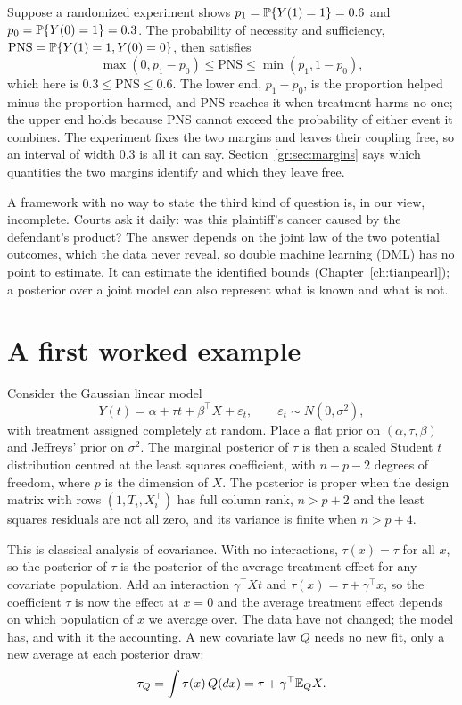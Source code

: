 Suppose a randomized experiment shows $p_1 = \mathbb{P}\{Y(1) = 1\} = 0.6$ and $p_0 = \mathbb{P}\{Y(0) = 1\} = 0.3$. The probability of necessity and sufficiency, $\mathrm{PNS} = \mathbb{P}\{Y(1) = 1, Y(0) = 0\}$, then satisfies
\[
\max(0, p_1 - p_0) \le \mathrm{PNS} \le \min(p_1, 1 - p_0),
\]
which here is $0.3 \le \mathrm{PNS} \le 0.6$. The lower end, $p_1 - p_0$, is the proportion helped minus the proportion harmed, and PNS reaches it when treatment harms no one; the upper end holds because PNS cannot exceed the probability of either event it combines. The experiment fixes the two margins and leaves their coupling free, so an interval of width 0.3 is all it can say. Section~\ref{gr:sec:margins} says which quantities the two margins identify and which they leave free.

A framework with no way to state the third kind of question is, in our view, incomplete. Courts ask it daily: was this plaintiff's cancer caused by the defendant's product? The answer depends on the joint law of the two potential outcomes, which the data never reveal, so double machine learning (DML) has no point to estimate. It can estimate the identified bounds (Chapter~\ref{ch:tianpearl}); a posterior over a joint model can also represent what is known and what is not.

\section{A first worked example}\label{sec:firstexample}

Consider the Gaussian linear model
\[
Y(t) = \alpha + \tau t + \beta^\top X + \varepsilon_t, \qquad \varepsilon_t \sim N(0, \sigma^2),
\]
with treatment assigned completely at random. Place a flat prior on $(\alpha, \tau, \beta)$ and Jeffreys' prior on $\sigma^2$. The marginal posterior of $\tau$ is then a scaled Student $t$ distribution centred at the least squares coefficient, with $n - p - 2$ degrees of freedom, where $p$ is the dimension of $X$. The posterior is proper when the design matrix with rows $(1, T_i, X_i^\top)$ has full column rank, $n > p + 2$ and the least squares residuals are not all zero, and its variance is finite when $n > p + 4$.

This is classical analysis of covariance. With no interactions, $\tau(x) = \tau$ for all $x$, so the posterior of $\tau$ is the posterior of the average treatment effect for any covariate population. Add an interaction $\gamma^\top X t$ and $\tau(x) = \tau + \gamma^\top x$, so the coefficient $\tau$ is now the effect at $x = 0$ and the average treatment effect depends on which population of $x$ we average over. The data have not changed; the model has, and with it the accounting. A new covariate law $Q$ needs no new fit, only a new average at each posterior draw:
\[
\tau_Q = \int \tau(x)\,Q(dx) = \tau + \gamma^\top \mathbb{E}_Q X.
\]



